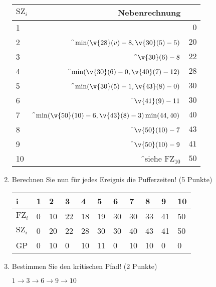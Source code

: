 \documentclass{lehramt-informatik-minimal}
\begin{document}
\begin{enumerate}
\begin{antwort}
\begin{tabular}{|l|r|r|}
\hline
$\text{SZ}_i$ & Nebenrechnung & \\\hline\hline
1 & & $0$ \\\hline
2 & \f$\min(\v{28}(v) - 8, \v{30}(5) - 5)$               & $20$ \\\hline
3 & \f$\v{30}(6) - 8$                                    & $22$ \\\hline
4 & \f$\min(\v{30}(6) - 0, \v{40}(7) - 12)$              & $28$ \\\hline
5 & \f$\min(\v{30}(5) - 1, \v{43}(8) - 0)$               & $30$ \\\hline
6 & \f$\v{41}(9) - 11$                                   & $30$ \\\hline
7 & \f$\min(\v{50}(10) - 6, \v{43}(8) - 3) \min(44, 40)$ & $40$ \\\hline
8 & \f$\v{50}(10) - 7$                                   & $43$ \\\hline
9 & \f$\v{50}(10) - 9$                                   & $41$ \\\hline
10 & \f{}siehe $\text{FZ}_10$                            & $50$ \\\hline
\end{tabular}
\end{antwort}


\item Berechnen Sie nun für jedes Ereignis die Pufferzeiten! (5 Punkte)

\begin{antwort}
\begin{tabular}{|l|l|l|l|l|l|l|l|l|l|l|}
\hline
i             & 1 & 2  & 3   & 4  & 5  & 6  & 7  & 8  & 9  & 10 \\\hline\hline
$\text{FZ}_i$ & 0 & 10 & 22  & 18 & 19 & 30 & 30 & 33 & 41 & 50 \\\hline
$\text{SZ}_i$ & 0 & 20 & 22  & 28 & 30 & 30 & 40 & 43 & 41 & 50 \\\hline
GP            & 0 & 10 & 0   & 10 & 11 & 0  & 10 & 10 & 0  & 0 \\\hline
\end{tabular}
\end{antwort}


\item Bestimmen Sie den kritischen Pfad! (2 Punkte)

\begin{antwort}
$1 \rightarrow 3 \rightarrow 6 \rightarrow 9 \rightarrow 10$


\end{antwort}
\end{enumerate}
\end{document}

